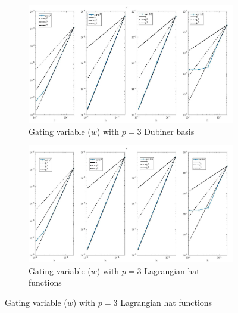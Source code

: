 \documentclass[a4paper,11pt]{article}
\begin{document}
\begin{figure}[H]
\caption{Comparison of the gating variable ($w$)}
\label{w_3}
\begin{subfigure}{\textwidth}
\begin{center}
\includegraphics[width = \textwidth]{./errors/D3_w_1.jpg}
\caption{Gating variable ($w$) with $p=3$ Dubiner basis}
\end{center}
\end{subfigure}
\begin{subfigure}{\textwidth}
\begin{center}
\includegraphics[width =\textwidth]{./errors/P3_w_1.jpg}
\caption{Gating variable ($w$) with $p=3$ Lagrangian hat functions}
\end{center}
\end{subfigure}
\end{figure}
\restoregeometry
\newpage
\end{document}
